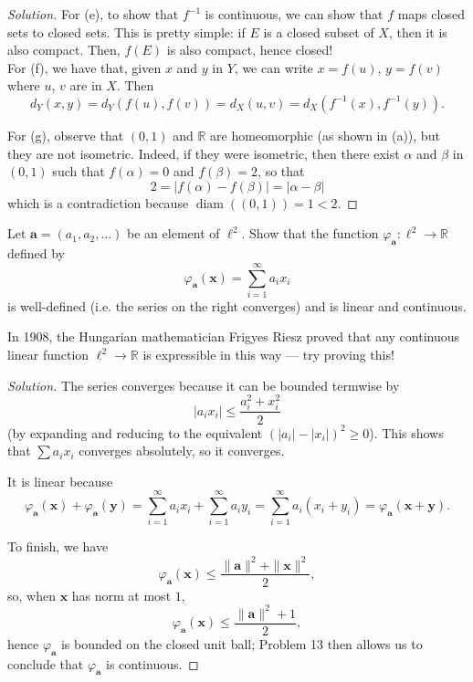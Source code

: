 \documentclass[11pt]{scrartcl}
\providecommand{\RR}{\mathbb R}
\providecommand{\inv}{^{-1}}
\providecommand{\mb}[1]{\mathbf{#1}}
\newenvironment{soln}{\begin{proof}[Solution]}{\end{proof}}
\begin{document}
\begin{soln}
	For (e), to show that $f\inv$ is continuous, we can show that
	$f$ maps closed sets to closed sets. This is pretty simple:
	if $E$ is a closed subset of $X$, then it is also compact.
	Then, $f(E)$ is also compact, hence closed!\\
	
	For (f), we have that, given $x$ and $y$ in $Y$,
	we can write $x = f(u)$, $y = f(v)$ where $u$, $v$ are in $X$. Then
	\[d_Y(x, y) = d_Y(f(u), f(v)) = d_X(u, v) = d_X(f\inv(x), f\inv(y)).\]
	
	For (g), observe that $(0, 1)$ and $\RR$ are homeomorphic
	(as shown in (a)), but they are not isometric.
	Indeed, if they were isometric, then there exist $\alpha$ and $\beta$
	in $(0, 1)$ such that $f(\alpha) = 0$ and $f(\beta) = 2$, so that
	\[2 = |f(\alpha) - f(\beta)| = |\alpha - \beta|\]
	which is a contradiction because $\operatorname{diam}((0,1)) = 1 < 2$.
\end{soln}

\begin{problem}
	Let $\mb a = (a_1, a_2, \dots)$ be an element of $\ell^2$.
	Show that the function $\varphi_{\mb a}\colon\ell^2\to\RR$ defined by
	\[\varphi_{\mb a}(\mb x) = \sum_{i=1}^\infty a_ix_i\]
	is well-defined (i.e. the series on the right converges)
	and is linear and continuous.
	
	In 1908, the Hungarian mathematician Frigyes Riesz proved that
	any continuous linear function $\ell^2\to\RR$
	is expressible in this way --- try proving this!
\end{problem}

\begin{soln}
	The series converges because it can be bounded termwise by
	\[|a_ix_i| \le \frac{a_i^2 + x_i^2}{2}\]
	(by expanding and reducing to the equivalent $(|a_i| - |x_i|)^2 \ge 0$).
	This shows that $\sum a_ix_i$ converges absolutely, so it converges.
	
	It is linear because
	\[\varphi_{\mb a}(\mb x) + \varphi_{\mb a}(\mb y)
	= \sum_{i=1}^\infty a_ix_i + \sum_{i=1}^\infty a_iy_i
	= \sum_{i=1}^\infty a_i(x_i + y_i)
	= \varphi_{\mb a}(\mb x + \mb y).\]
		
	To finish, we have
	\[\varphi_{\mb a}(\mb x) \le \frac{\|\mb a\|^2 + \|\mb x\|^2}{2},\]
	so, when $\mb x$ has norm at most $1$,
	\[\varphi_{\mb a}(\mb x) \le \frac{\|\mb a\|^2 + 1}{2},\]
	hence $\varphi_{\mb a}$ is bounded on the closed unit ball;
	Problem 13 then allows us to conclude that $\varphi_{\mb a}$
	is continuous.
\end{soln}
\end{document}
